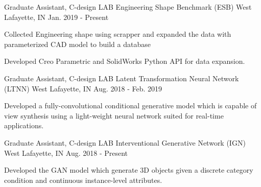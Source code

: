 


\begin{cventries}

\cventry
{Graduate Assistant, C-design LAB} %
{Engineering Shape Benchmark (ESB)} %
{West Lafayette, IN} %
{Jan. 2019 - Present} %
{ %
\begin{cvitems}
\item {Collected Engineering shape using scrapper and expanded the data with parameterized CAD model to build a database}
\item {Developed Creo Parametric and SolidWorks Python API for data expansion.}
\end{cvitems}
}


\cventry
{Graduate Assistant, C-design LAB} %
{Latent Transformation Neural Network (LTNN)} %
{West Lafayette, IN} %
{Aug. 2018 - Feb. 2019} %
{ %
\begin{cvitems}
\item {Developed a fully-convolutional conditional generative model which is capable of view synthesis using a light-weight neural network suited for real-time applications.}
\end{cvitems}
}


\cventry
{Graduate Assistant, C-design LAB} %
{Interventional Generative Network (IGN)} %
{West Lafayette, IN} %
{Aug. 2018 - Present} %
{ %
\begin{cvitems}
\item {Developed the GAN model which generate 3D objects given a discrete
category condition and continuous instance-level attributes.}
\end{cvitems}
}


\end{cventries}
